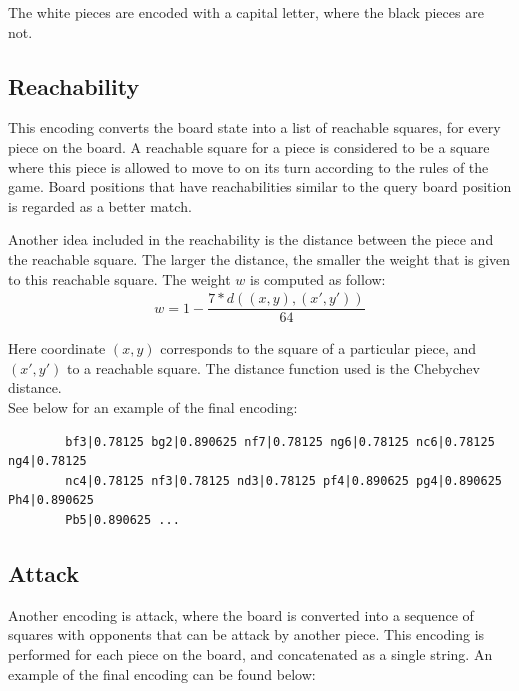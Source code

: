 \documentclass[11pt]{article}
\begin{document}
    The white pieces are encoded with a capital letter, where the black pieces are not.

    \subsection{Reachability}

    This encoding converts the board state into a list of reachable squares, for every piece on the board. A reachable square for a piece is considered to be a square where this piece is allowed to move to on its turn according to the rules of the game. Board positions that have reachabilities similar to the query board position is regarded as a better match.

    Another idea included in the reachability is the distance between the piece and the reachable square. The larger the distance, the smaller the weight that is given to this reachable square.
    The weight $w$ is computed as follow:\\

    \begin{equation}
        \begin{align}
            w = 1 - \dfrac{7 * d((x,y),(x',y'))}{64}
        \end{align}\label{eq:reachabilityDistance}
    \end{equation}

    Here coordinate $(x,y)$ corresponds to the square of a particular piece, and $(x',y')$ to a reachable square. The distance function used is the Chebychev distance.\\
    See below for an example of the final encoding:

    \begin{BVerbatim}
        bf3|0.78125 bg2|0.890625 nf7|0.78125 ng6|0.78125 nc6|0.78125 ng4|0.78125
        nc4|0.78125 nf3|0.78125 nd3|0.78125 pf4|0.890625 pg4|0.890625 Ph4|0.890625
        Pb5|0.890625 ...
    \end{BVerbatim}

    \subsection{Attack}

    Another encoding is attack, where the board is converted into a sequence of squares with opponents that can be attack by another piece. This encoding is performed for each piece on the board, and concatenated as a single string. An example of the final encoding can be found below:
\end{document}
